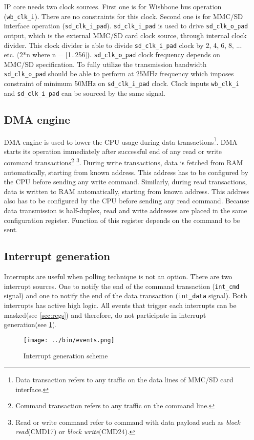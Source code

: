     IP core needs two clock sources. First one is for Wishbone bus operation (\texttt{wb\_clk\_i}). There are no constraints for this clock. 
    Second one is for MMC/SD interface operation (\texttt{sd\_clk\_i\_pad}). 
    \texttt{sd\_clk\_i\_pad} is used to drive \texttt{sd\_clk\_o\_pad} output, which is the external MMC/SD card clock source, through internal
    clock divider. This clock divider is able to divide \texttt{sd\_clk\_i\_pad} clock by 2, 4, 6, 8, ... etc. (2*n where n = [1..256]).
    \texttt{sd\_clk\_o\_pad} clock frequency depends on MMC/SD specification. To fully utilize the transmission bandwidth \texttt{sd\_clk\_o\_pad}
    should be able to perform at 25MHz frequency which imposes constraint of minimum 50MHz on \texttt{sd\_clk\_i\_pad} clock. 
    Clock inputs \texttt{wb\_clk\_i} and \texttt{sd\_clk\_i\_pad} can be sourced by the same signal.
    
    \subsection{DMA engine}
    \label{sec:dma}
    
    DMA engine is used to lower the CPU usage during data transactions\footnote{Data transaction refers to any traffic on the data lines of MMC/SD card interface.}.
    DMA starts its operation immediately after successful end of any read or write command transactions\footnote{Command transaction refers to any traffic on the command line.}
    \footnote{Read or write command refer to command with data payload such as \textit{block read}(CMD17) or \textit{block write}(CMD24).}.
    During write transactions, data is fetched from RAM automatically, starting from known address. This address has to be configured by the CPU before sending any write command. 
    Similarly, during read transactions, data is written to RAM automatically, starting from known address. 
    This address also has to be configured by the CPU before sending any read command. Because data transmission is half-duplex, 
    read and write addresses are placed in the same configuration register. Function of this register depends on the command to be sent.
    
    \subsection{Interrupt generation}
    \label{sec:interrupt}
    
    Interrupts are useful when polling technique is not an option. There are two interrupt sources. One to notify the end of the command transaction (\texttt{int\_cmd} signal) and
    one to notify the end of the data transaction (\texttt{int\_data} signal). Both interrupts has active high logic. All events that trigger each interrupts can be masked(see \ref{sec:regs})
    and therefore, do not participate in interrupt generation(see \ref{img:events}).
    \begin{figure}[H]
        \centering
        \texttt{[image: ../bin/events.png]}
        \caption{Interrupt generation scheme}
        \label{img:events}
    \end{figure}
    
